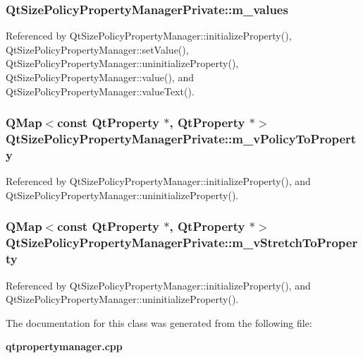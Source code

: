 \subsubsection[{m\+\_\+values}]{ Qt\+Size\+Policy\+Property\+Manager\+Private\+::m\+\_\+values}\label{classQtSizePolicyPropertyManagerPrivate_afe84eafe6615c8af48f2037c3726b248}


Referenced by Qt\+Size\+Policy\+Property\+Manager\+::initialize\+Property(), Qt\+Size\+Policy\+Property\+Manager\+::set\+Value(), Qt\+Size\+Policy\+Property\+Manager\+::uninitialize\+Property(), Qt\+Size\+Policy\+Property\+Manager\+::value(), and Qt\+Size\+Policy\+Property\+Manager\+::value\+Text().

\subsubsection[{m\+\_\+v\+Policy\+To\+Property}]{\setlength{\rightskip}{0pt plus 5cm}Q\+Map$<$const {\bf Qt\+Property} $\ast$, {\bf Qt\+Property} $\ast$$>$ Qt\+Size\+Policy\+Property\+Manager\+Private\+::m\+\_\+v\+Policy\+To\+Property}\label{classQtSizePolicyPropertyManagerPrivate_a9d05fbe5b6c0e769d9b7baff04c89de5}


Referenced by Qt\+Size\+Policy\+Property\+Manager\+::initialize\+Property(), and Qt\+Size\+Policy\+Property\+Manager\+::uninitialize\+Property().

\subsubsection[{m\+\_\+v\+Stretch\+To\+Property}]{\setlength{\rightskip}{0pt plus 5cm}Q\+Map$<$const {\bf Qt\+Property} $\ast$, {\bf Qt\+Property} $\ast$$>$ Qt\+Size\+Policy\+Property\+Manager\+Private\+::m\+\_\+v\+Stretch\+To\+Property}\label{classQtSizePolicyPropertyManagerPrivate_a2c7ea54687efecf1c990c96041e58e2c}


Referenced by Qt\+Size\+Policy\+Property\+Manager\+::initialize\+Property(), and Qt\+Size\+Policy\+Property\+Manager\+::uninitialize\+Property().



The documentation for this class was generated from the following file\+:\begin{DoxyCompactItemize}
\item 
{\bf qtpropertymanager.\+cpp}\end{DoxyCompactItemize}
